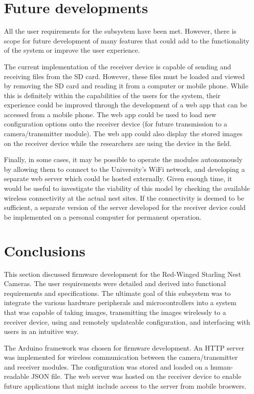 \documentclass[class=report,11pt,crop=false]{standalone}
\begin{document}
\section{Future developments}

All the user requirements for the subsystem have been met. However, there is scope for future development of many features that could add to the functionality of the system or improve the user experience.

The current implementation of the receiver device is capable of sending and receiving files from the SD card. However, these files must be loaded and viewed by removing the SD card and reading it from a computer or mobile phone. While this is definitely within the capabilities of the users for the system, their experience could be improved through the development of a web app that can be accessed from a mobile phone. The web app could be used to load new configuration options onto the receiver device (for future transmission to a camera/transmitter module). The web app could also display the stored images on the receiver device while the researchers are using the device in the field.

Finally, in some cases, it may be possible to operate the modules autonomously by allowing them to connect to the University's WiFi network, and developing a separate web server which could be hosted externally. Given enough time, it would be useful to investigate the viability of this model by checking the available wireless connectivity at the actual nest sites. If the connectivity is deemed to be sufficient, a separate version of the server developed for the receiver device could be implemented on a personal computer for permanent operation.

\section{Conclusions}

This section discussed firmware development for the Red-Winged Starling Nest Cameras. The user requirements were detailed and derived into functional requirements and specifications. The ultimate goal of this subsystem was to integrate the various hardware peripherals and microcontrollers into a system that was capable of taking images, transmitting the images wirelessly to a receiver device, using and remotely updateable configuration, and interfacing with users in an intuitive way. 

The Arduino framework was chosen for firmware development. An HTTP server was implemented for wireless communication between the camera/transmitter and receiver modules. The configuration was stored and loaded on a human-readable JSON file. The web server was hosted on the receiver device to enable future applications that might include access to the server from mobile broswers.
\end{document}
